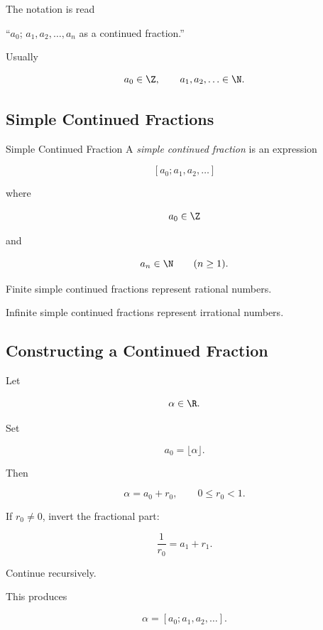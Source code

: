 The notation is read

\begin{center}
``\(a_0\); \(a_1,a_2,\ldots,a_n\) as a continued fraction.''
\end{center}

Usually

\[ a_0\in\Z,\qquad a_1,a_2,\ldots\in\N. \]

\subsection{Simple Continued Fractions}
\label{subsec:simple-continued-fractions}

\begin{definitionbox}{Simple Continued Fraction}
A \emph{simple continued fraction} is an expression

\[ [a_0;a_1,a_2,\ldots] \]

where

\[ a_0\in\Z \]

and

\[ a_n\in\N\qquad(n\geq1). \]
\end{definitionbox}

Finite simple continued fractions represent rational numbers.

Infinite simple continued fractions represent irrational numbers.

\subsection{Constructing a Continued Fraction}
\label{subsec:constructing-continued-fraction}

Let

\[ \alpha\in\R. \]

Set

\[ a_0=\lfloor\alpha\rfloor. \]

Then

\[ \alpha=a_0+r_0,\qquad0\leq r_0<1. \]

If \(r_0\neq0\), invert the fractional part:

\[ \frac1{r_0}=a_1+r_1. \]

Continue recursively.

This produces

\[ \alpha=[a_0;a_1,a_2,\ldots]. \]

